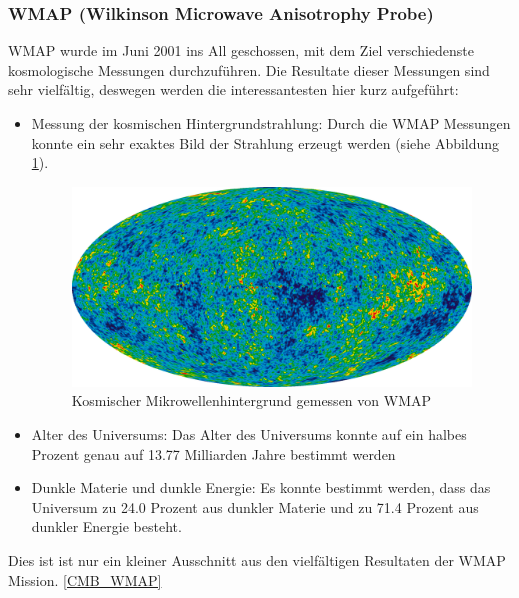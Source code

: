 	\subsubsection{WMAP (Wilkinson Microwave Anisotrophy Probe)}
	WMAP wurde im Juni 2001 ins All geschossen, mit dem Ziel verschiedenste kosmologische Messungen durchzuführen.
	Die Resultate dieser Messungen sind sehr vielfältig, deswegen werden die interessantesten hier kurz aufgeführt:
	\begin{itemize}
		\item Messung der kosmischen Hintergrundstrahlung: Durch die WMAP Messungen konnte ein sehr exaktes Bild der Strahlung erzeugt werden (siehe Abbildung \ref{fig:CMB_WMAP}).
		\begin{figure}
			\includegraphics[scale=1]{cmb/images/CMB_WMAP.png}
			\caption{Kosmischer Mikrowellenhintergrund gemessen von WMAP}
			\label{fig:CMB_WMAP}
		\end{figure}
		\item Alter des Universums: Das Alter des Universums konnte auf ein halbes Prozent genau auf 13.77 Milliarden Jahre bestimmt werden
		\item Dunkle Materie und dunkle Energie: Es konnte bestimmt werden, dass das Universum zu 24.0 Prozent aus dunkler Materie und zu 71.4 Prozent aus dunkler Energie besteht.
	\end{itemize}
	Dies ist ist nur ein kleiner Ausschnitt aus den vielfältigen Resultaten der WMAP Mission.
	\ref{CMB_WMAP}
	
